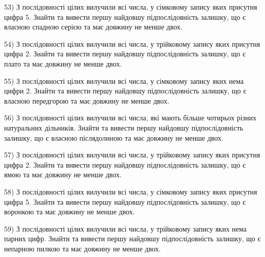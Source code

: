 \documentclass[11pt, ukrainian]{article}
\begin{document}
\par
\vspace{0.9cm}
53) \space 
З послідовності цілих вилучили всі числа, у сімковому запису яких присутня цифра 5. Знайти та вивести першу найдовшу підпослідовність залишку, що є власною спадною серією та має довжину не менше двох.

\par
\vspace{0.9cm}
54) \space 
З послідовності цілих вилучили всі числа, у трійковому запису яких присутня цифра 2. Знайти та вивести першу найдовшу підпослідовність залишку, що є плато та має довжину не менше двох.

\par
\vspace{0.9cm}
55) \space 
З послідовності цілих вилучили всі числа, у сімковому запису яких нема цифри 2. Знайти та вивести першу найдовшу підпослідовність залишку, що є власною передгорою та має довжину не менше двох.

\par
\vspace{0.9cm}
56) \space 
З послідовності цілих вилучили всі числа, які мають більше чотирьох різних натуральних дільників. Знайти та вивести першу найдовшу підпослідовність залишку, що є власною післядолиною та має довжину не менше двох.

\par
\vspace{0.9cm}
57) \space 
З послідовності цілих вилучили всі числа, у трійковому запису яких присутня цифра 2. Знайти та вивести першу найдовшу підпослідовність залишку, що є ямою та має довжину не менше двох.

\par
\vspace{0.9cm}
58) \space 
З послідовності цілих вилучили всі числа, у сімковому запису яких присутня цифра 5. Знайти та вивести першу найдовшу підпослідовність залишку, що є воронкою та має довжину не менше двох.

\par
\vspace{0.9cm}
59) \space 
З послідовності цілих вилучили всі числа, у трійковому запису яких нема парних цифр. Знайти та вивести першу найдовшу підпослідовність залишку, що є непарною пилкою та має довжину не менше двох.
\end{document}
